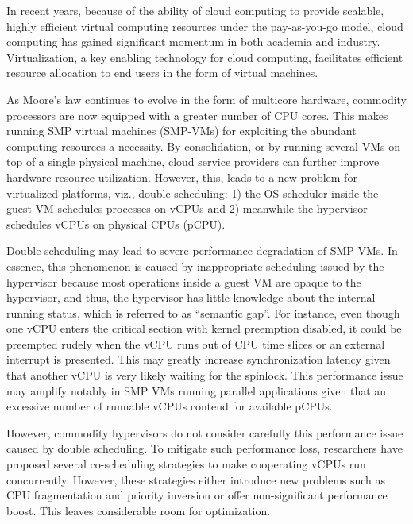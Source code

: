\begin{englishabstract}

In recent years, because of the ability of cloud computing to provide scalable, highly efficient virtual computing resources under the pay-as-you-go model, cloud computing has gained significant momentum in both academia and industry. Virtualization, a key enabling technology for cloud computing, facilitates efficient resource allocation to end users in the form of virtual machines.

As Moore's law continues to evolve in the form of multicore hardware, commodity processors are now equipped with a greater number of CPU cores. This makes running SMP virtual machines (SMP-VMs) for exploiting the abundant computing resources a necessity. By consolidation, or by running several VMs on top of a single physical machine, cloud service providers can further improve hardware resource utilization. However, this, leads to a new problem for virtualized platforms, viz., double scheduling: 1) the OS scheduler inside the guest VM schedules processes on vCPUs and 2) meanwhile the hypervisor schedules vCPUs on physical CPUs (pCPU). 

Double scheduling may lead to severe performance degradation of SMP-VMs. In essence, this phenomenon is caused by inappropriate scheduling issued by the hypervisor because most operations inside a guest VM are opaque to the hypervisor, and thus, the hypervisor has little knowledge about the internal running status, which is referred to as ``semantic gap''. For instance, even though one vCPU enters the critical section with kernel preemption disabled, it could be preempted rudely when the vCPU runs out of CPU time slices or an external interrupt is presented. This may greatly increase synchronization latency given that another vCPU is very likely waiting for the spinlock. This performance issue may amplify notably in SMP VMs running parallel applications given that an excessive number of runnable vCPUs contend for available pCPUs.

However, commodity hypervisors do not consider carefully this performance issue caused by double scheduling. To mitigate such performance loss, researchers have proposed several co-scheduling strategies to make cooperating vCPUs run concurrently. However, these strategies either introduce new problems such as CPU fragmentation and priority inversion or offer non-significant performance boost. This leaves considerable room for optimization.

\end{englishabstract}
